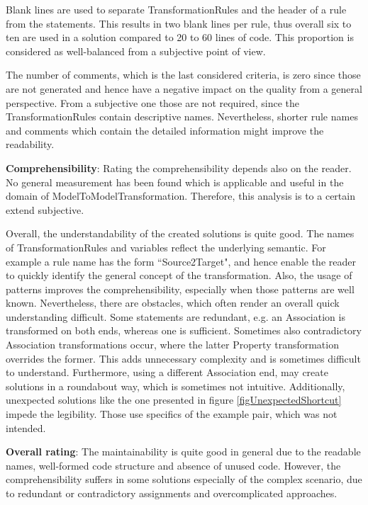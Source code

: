 Blank lines are used to separate \glspl{TransformationRule} and the header of a rule from the statements. This results in two blank lines per rule, thus overall six to ten are used in a solution compared to 20 to 60 lines of code. This proportion is considered as well-balanced from a subjective point of view.

The number of comments, which is the last considered criteria, is zero since those are not generated and hence have a negative impact on the quality from a general perspective. From a subjective one those are not required, since the \glspl{TransformationRule} contain descriptive names. Nevertheless, shorter rule names and comments which contain the detailed information might improve the readability. 

\textbf{Comprehensibility}: Rating the comprehensibility depends also on the reader. No general measurement has been found which is applicable and useful in the domain of \gls{ModelToModelTransformation}. Therefore, this analysis is to a certain extend subjective. 

Overall, the understandability of the created solutions is quite good. The names of \glspl{TransformationRule} and variables reflect the underlying semantic. For example a rule name has the form ``Source2Target", and hence enable the reader to quickly identify the general concept of the transformation. Also, the usage of patterns improves the comprehensibility, especially when those patterns are well known. Nevertheless, there are obstacles, which often render an overall quick understanding difficult. Some statements are redundant, e.g. an \gls{Association} is transformed on both ends, whereas one is sufficient. Sometimes also contradictory \gls{Association} transformations occur, where the latter \gls{Property} transformation overrides the former. This adds unnecessary complexity and is sometimes difficult to understand. Furthermore, using a different \gls{Association} end, may create solutions in a roundabout way, which is sometimes not intuitive. Additionally, unexpected solutions like the one presented in figure \ref{figUnexpectedShortcut} impede the legibility. Those use specifics of the example pair, which was not intended.

\textbf{Overall rating}: The maintainability is quite good in general due to the readable names, well-formed code structure and absence of unused code. However, the comprehensibility suffers in some solutions especially of the complex scenario, due to redundant or contradictory assignments and overcomplicated approaches.